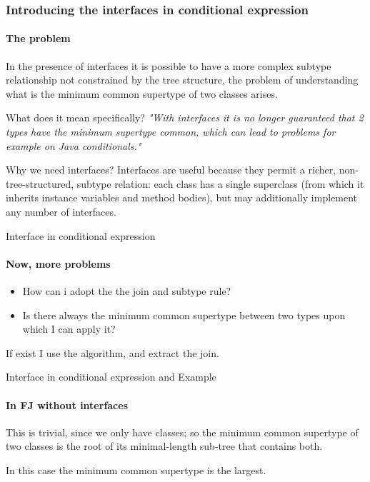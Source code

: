 \documentclass{beamer}
\begin{document}
\begin{frame}
	\frametitle{Introducing the interfaces in conditional expression}
	\framesubtitle{The problem}
	In the presence of interfaces it is possible to have a more complex subtype relationship not constrained by the tree structure, the problem of understanding what is the minimum common supertype of two classes arises.\newline
	\begin{block}{What does it mean specifically?}
		\textit{"With interfaces it is no longer guaranteed that 2 types have the minimum supertype common, which can lead to problems for example on Java conditionals."}
	\end{block}
\end{frame}

\begin{frame}{Why we need interfaces?}
    Interfaces are useful because they permit a richer, non-tree-structured, subtype relation: each class has a single superclass (from which it inherits instance variables and method bodies), but may additionally implement any number of interfaces.\newline\newline
    

\end{frame}

\begin{frame}{Interface in conditional expression}
\framesubtitle{Now, more problems}
\begin{itemize}
    \item  How can i adopt the the join and subtype rule?
    \item  Is there always the minimum common supertype between two types upon which I can apply it?
    \end{itemize}
If exist I use the algorithm, and extract the join.
\end{frame}


\begin{frame}{Interface in conditional expression and Example}
\framesubtitle{In FJ without interfaces}
This is trivial, since we only have classes; so the minimum common supertype of two classes is the root of its minimal-length sub-tree that contains both.
    \begin{center}
\end{center}
In this case the minimum common supertype is the largest.
\end{frame}
\end{document}
